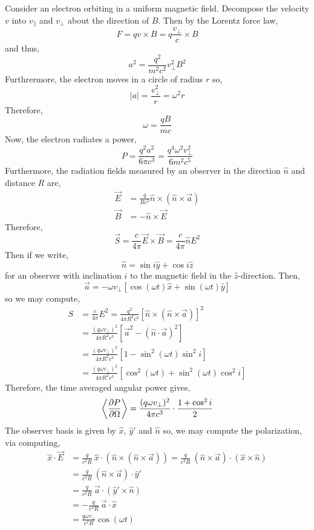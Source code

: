 \documentclass[11pt, a4paper]{article}
\begin{document}
Consider an electron orbiting in a uniform magnetic field. Decompose the velocity $v$ into $v_{\parallel}$ and $v_\perp$ about the direction of $B$. Then by the Lorentz force law,
\[ F = q v \times B = q \frac{v_\perp}{c} \times B \]
and thus, 
\[ a^2 = \frac{q^2}{m^2 c^2} v_\perp^2 B^2 \]
Furthrermore, the electron moves in a circle of radius $r$ so,
\[ |a| = \frac{v_\perp^2}{r} = \omega^2 r \]
Therefore,
\[ \omega = \frac{q B}{mc} \]
Now, the electron radiates a power,
\[ P = \frac{q^2 a^2}{6 \pi c^3} = \frac{q^4 \omega^2 v_\perp^2}{6 m^2 c^5}  \]
Furthermore, the radiation fields measured by an observer in the direction $\hat{n}$ and distance $R$ are,
\begin{align*}
\vec{E} & = \frac{q}{R c^2} \hat{n} \times (\hat{n} \times \vec{a}) 
\\
\vec{B} &= - \hat{n} \times \vec{E}
\end{align*}
Therefore,
\[ \vec{S} = \frac{c}{4 \pi} \vec{E} \times \vec{B} = \frac{c}{4 \pi} \hat{n} E^2 \]
Then if we write,
\[ \hat{n} = \sin{i} \hat{y} + \cos{i} \hat{z} \]
for an observer with inclination $i$ to the magnetic field in the $\hat{z}$-direction. Then,
\[ \vec{a} = - \omega v_\perp [ \cos{(\omega t)} \hat{x} + \sin{(\omega t)} \hat{y} ]\]
so we may compute,
\begin{align*}
S & = \frac{c}{4 \pi} E^2 = \frac{q^2}{4 \pi R^2 c^3} [\hat{n} \times (\hat{n} \times \vec{a})]^2
\\
& = \frac{(q \omega v_\perp)^2}{4 \pi R^2 c^3} [\vec{a}^2 - (\hat{n} \cdot \vec{a})^2 ]
\\
& = \frac{(q \omega v_\perp)^2}{4 \pi R^2 c^3} [1 - \sin^2{(\omega t)} \sin^2{i} ]
\\
& = \frac{(q \omega v_\perp)^2}{4 \pi R^2 c^3} [ \cos^2{(\omega t)} + \sin^2{(\omega t)} \cos^2{i} ] 
\end{align*}
Therefore, the time averaged angular power gives, 
\[ \left< \frac{\partial{P}}{\partial{\Omega}} \right> = \frac{(q \omega v_\perp)^2}{4 \pi c^3} \cdot \frac{1 + \cos^2{i}}{2} \]
The observer basis is given by $\hat{x}$, $\hat{y}'$ and $\hat{n}$
so, we may compute the polarization, via computing,
\begin{align*}
\hat{x} \cdot \vec{E} & = \frac{q}{c^2 R} \: \hat{x} \cdot (\hat{n} \times (\hat{n} \times \vec{a})) = \frac{q}{c^2 R} \: (\hat{n} \times \vec{a}) \cdot (\hat{x} \times \hat{n})
\\
& = \frac{q}{c^2 R} \: (\hat{n} \times \vec{a}) \cdot \hat{y}'
\\
& = \frac{q}{c^2 R} \: \vec{a} \cdot (\hat{y}' \times \hat{n})
\\
& = - \frac{q}{c^2 R} \: \vec{a} \cdot \hat{x}
\\
& = \frac{q \omega v_\perp}{c^2 R} \cos{(\omega t)}
\end{align*}
\end{document}
